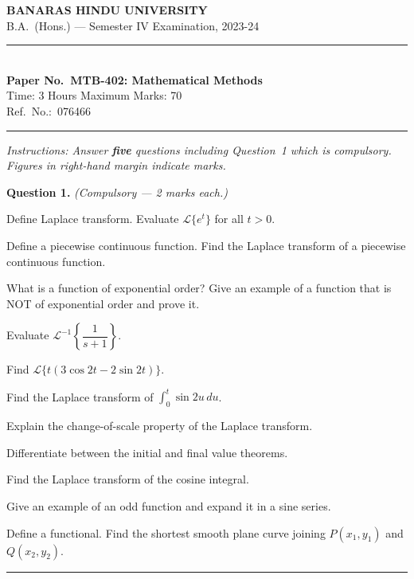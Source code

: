 \documentclass[11pt,a4paper]{article}
\begin{document}
\begin{center}
  {\large\bfseries BANARAS HINDU UNIVERSITY}\\[2pt]
  {\normalsize B.A.\ (Hons.) --- Semester IV Examination, 2023-24}\\[6pt]
  \rule{0.8\linewidth}{0.5pt}\\[6pt]
  {\large\bfseries Paper No.\ MTB-402: Mathematical Methods}\\[4pt]
  {\normalsize Time: 3 Hours \hfill Maximum Marks: 70}\\[2pt]
  {\small Ref.\ No.:\ 076466}
\end{center}
\rule{\linewidth}{0.4pt}
\smallskip



\noindent   \textit{Instructions: Answer   \textbf{five} questions including Question~1 which is compulsory. Figures in right-hand margin indicate marks.}
\bigskip




\noindent   \textbf{Question 1.}   \textit{(Compulsory --- 2 marks each.)}

\begin{parts}
  \item Define Laplace transform. Evaluate $\mathcal{L}\{e^t\}$ for all $t>0$.
  \item Define a piecewise continuous function. Find the Laplace transform of a piecewise continuous function.
  \item What is a function of exponential order? Give an example of a function that is NOT of exponential order and prove it.
  \item Evaluate $\mathcal{L}^{-1}\!\left\{\dfrac{1}{s+1}\right\}$.
  \item Find $\mathcal{L}\{t(3\cos 2t-2\sin 2t)\}$.
  \item Find the Laplace transform of $\displaystyle\int_0^t\sin 2u\,du$.
  \item Explain the change-of-scale property of the Laplace transform.
  \item Differentiate between the initial and final value theorems.
  \item Find the Laplace transform of the cosine integral.
  \item Give an example of an odd function and expand it in a sine series.
  \item Define a functional. Find the shortest smooth plane curve joining $P(x_1,y_1)$ and $Q(x_2,y_2)$.
\end{parts}
\medskip\rule{\linewidth}{0.2pt}
\end{document}
